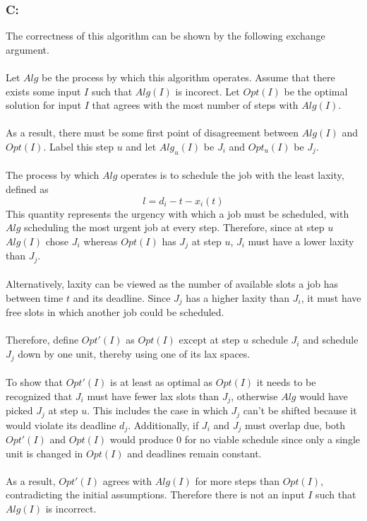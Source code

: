 \documentclass[12pt]{article}
\begin{document}
\subsubsection*{C:}
The correctness of this algorithm can be shown by the following exchange argument.\\\\ 
Let $Alg$ be the process by which this algorithm operates.
Assume that there exists some input $I$ such that $Alg(I)$ is incorect.  Let $Opt(I)$
be the optimal solution for input $I$ that agrees with the most number of steps with
$Alg(I)$.\\\\
As a result, there must be some first point of disagreement between $Alg(I)$ and $Opt(I)$.
Label this step $u$ and let $Alg_u(I)$ be $J_i$ and $Opt_u(I)$ be $J_j$.\\\\
The process by which $Alg$ operates is to schedule the job with the least laxity, defined as
\[
l = d_i - t - x_i(t)
\]   
This quantity represents the urgency with which a job must be scheduled, with $Alg$ scheduling
the most urgent job at every step.  Therefore, since at step $u$ $Alg(I)$ chose $J_i$ whereas
$Opt(I)$ has $J_j$ at step $u$, $J_i$ must have a lower laxity than $J_j$.\\\\
Alternatively, laxity can be viewed as the number of available slots a job has between time $t$
and its deadline.  Since $J_j$ has a higher laxity than $J_i$, it must have free slots in which
another job could be scheduled.\\\\
Therefore, define $Opt'(I)$ as $Opt(I)$ except at step $u$ schedule $J_i$ and schedule $J_j$ down
by one unit, thereby using one of its lax spaces.\\\\
To show
that $Opt'(I)$ is at least as optimal as $Opt(I)$ it needs to be recognized that $J_i$ must have
fewer lax slots than $J_j$, otherwise $Alg$ would have picked $J_j$ at step $u$.  This includes
the case in which $J_j$ can't be shifted because it would violate its deadline $d_j$.  Additionally,
if $J_i$ and $J_j$ must overlap due, both $Opt'(I)$ and $Opt(I)$ would produce $0$ for no viable
schedule since only a single unit is changed in $Opt(I)$ and deadlines remain constant.\\\\
As a result,
$Opt'(I)$ agrees with $Alg(I)$ for more steps than $Opt(I)$, contradicting the initial assumptions. 
Therefore there is not an input $I$ such that $Alg(I)$ is incorrect.  
\end{document}
